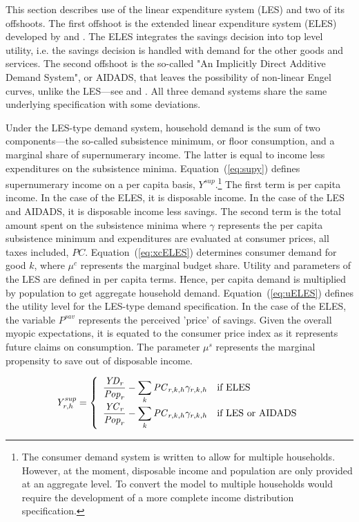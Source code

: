 \documentclass[11pt,letterpaper]{report}
\begin{document}
This section describes use of the linear expenditure system (LES) and two of its
offshoots. The first offshoot is the extended linear expenditure system (ELES)
developed by \cite{Lluch1973} and \cite{Howe1975}. The ELES integrates the
savings decision into top level utility, i.e. the savings decision is handled
with demand for the other goods and services. The second offshoot is the
so-called "An Implicitly Direct Additive Demand System", or AIDADS, that leaves
the possibility of non-linear Engel curves, unlike the
LES---see \cite{RimmerPowell1992B} and \cite{RimmerPowell1996}. All three demand
systems share the same underlying specification with some deviations.

Under the LES-type demand system, household demand is the sum of two
components---the so-called subsistence minimum, or floor consumption, and a
marginal share of supernumerary income. The latter is equal to income less
expenditures on the subsistence minima. Equation~(\ref{eq:supy}) defines
supernumerary income on a per capita basis,
$\mathit{Y^{sup}}$.\footnote{The consumer demand system is written to allow for
multiple households. However, at the moment, disposable income and population
are only provided at an aggregate level. To convert the model to multiple
households would require the development of a more complete income distribution
specification.} The first term is per capita income. In the case of the
ELES, it is disposable income. In the case of the LES and AIDADS, it is
disposable income less savings. The second term is the total amount spent on the
subsistence minima where $\gamma$ represents the per capita subsistence minimum
and expenditures are evaluated at consumer prices, all taxes included,
$\mathit{PC}$. Equation~(\ref{eq:xcELES}) determines consumer demand for good
$k$, where $\mu^c$ represents the marginal budget share. Utility and parameters
of the LES are defined in per capita terms. Hence, per capita demand is
multiplied by population to get aggregate household demand.
Equation~(\ref{eq:uELES}) defines the utility level for the LES-type demand
specification. In the case of the ELES, the variable $P^{\mathit{sav}}$
represents the perceived 'price' of savings. Given the overall myopic
expectations, it is equated to the consumer price index as it represents future
claims on consumption. The parameter $\mu^s$ represents the marginal propensity
to save out of disposable income.

\begin{equation}
\label{eq:supy}
\mathit{Y}^{\mathit{sup}}_{r,h} =
\left\{
   \begin{array}{l l}
      \displaystyle \frac{\mathit{YD}_r} {\mathit{Pop}_r}
         - \sum_k {\mathit{PC}_{r,k,h} \gamma_{r,k,h}}
   & \textrm{if ELES} \\
      \displaystyle \frac{\mathit{YC}_r}
         {\mathit{Pop}_r} - \sum_k{\mathit{PC}_{r,k,h} \gamma_{r,k,h}}
   &  \textrm{if LES or AIDADS} \\
   \end{array}
\right.
\end{equation}
\end{document}

